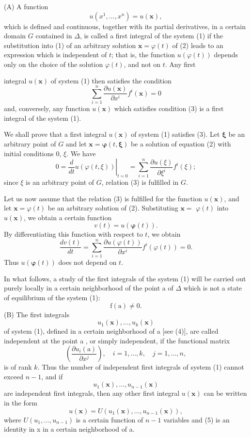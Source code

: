 \documentclass[10pt,a5paper]{book}
\theoremstyle{plain}
\theoremstyle{definition}
\theoremstyle{remark}
\begin{document}
(A) A function
\[
u\left(x^{1}, \ldots, x^{n}\right)=u(\mathbf{x}),
\]
which is defined and continuous, together with its partial derivatives, in a certain domain $G$ contained in $\Delta$, is called a first integral of the system (1) if the substitution into (1) of an arbitrary solution $\mathbf{x}=\varphi(t)$ of (2) leads to an expression which is independent of $t$; that is, the function $u(\varphi(t))$ depends only on the choice of the solution $\varphi(t)$, and not on $t$. Any first

integral $u(\mathbf{x})$ of system (1) then satisfies the condition
\begin{equation*}
\sum_{i=1}^{n} \frac{\partial u(\mathbf{x})}{\partial x^{i}} f^{i}(\mathbf{x})=0 \tag{3}
\end{equation*}
and, conversely, any function $u(\mathbf{x})$ which satisfies condition (3) is a first integral of the system (1).

We shall prove that a first integral $u(\mathbf{x})$ of system (1) satisfies (3). Let $\boldsymbol{\xi}$ be an arbitrary point of $G$ and let $\mathbf{x}=\boldsymbol{\varphi}(t, \boldsymbol{\xi})$ be a solution of equation (2) with initial conditions 0, $\xi$. We have
\[
0=\left.\frac{d}{d t} u(\varphi(t, \xi))\right|_{t=0}=\sum_{i=1}^{n} \frac{\partial u(\xi)}{\partial \xi^{i}} f^{i}(\xi) ;
\]
since $\xi$ is an arbitrary point of $G$, relation (3) is fulfilled in $G$.

Let us now assume that the relation (3) is fulfilled for the function $u(\mathbf{x})$, and let $\mathbf{x}=\varphi(t)$ be an arbitrary solution of (2). Substituting $\mathbf{x}=$ $\varphi(t)$ into $u(\mathbf{x})$, we obtain a certain function
\[
v(t)=u(\boldsymbol{\varphi}(t)) .
\]
By differentiating this function with respect to $t$, we obtain
\[
\frac{d v(t)}{d t}=\sum_{i=1}^{n} \frac{\partial u(\varphi(t))}{\partial x^{i}} f^{i}(\varphi(t))=0 .
\]
Thus $u(\boldsymbol{\varphi}(t))$ does not depend on $t$.

In what follows, a study of the first integrals of the system (1) will be carried out purely locally in a certain neighborhood of the point a of $\Delta$ which is not a state of equilibrium of the system (1):
\begin{equation*}
\mathrm{f}(\mathrm{a}) \neq 0 . \tag{4}
\end{equation*}
(B) The first integrals
\[
u_{1}(\mathbf{x}), \ldots, u_{k}(\mathbf{x})
\]
of system (1), defined in a certain neighborhood of a [see (4)], are called independent at the point a , or simply independent, if the functional matrix
\[
\left(\frac{\partial u_{i}(\mathrm{a})}{\partial x^{j}}\right), \quad i=1, \ldots, k, \quad j=1, \ldots, n,
\]
is of rank $k$. Thus the number of independent first integrals of system (1) cannot exceed $n-1$, and if
\[
u_{1}(\mathbf{x}), \ldots, u_{n-1}(\mathbf{x})
\]
are independent first integrals, then any other first integral $u(\mathbf{x})$ can be written in the form
\begin{equation*}
u(\mathbf{x})=U\left(u_{1}(\mathbf{x}), \ldots, u_{n-1}(\mathbf{x})\right), \tag{5}
\end{equation*}
where $U\left(u_{1}, \ldots, u_{n-1}\right)$ is a certain function of $n-1$ variables and (5) is an identity in x in a certain neighborhood of a.
\end{document}
